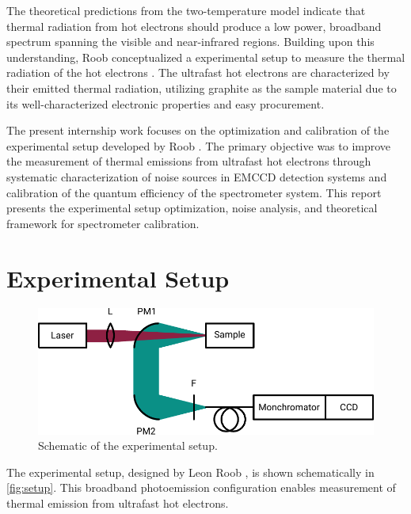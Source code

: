 \documentclass[
	parskip=half,
	a4paper,
]{scrarticle}
\begin{document}
The theoretical predictions from the two-temperature model indicate that thermal radiation from hot electrons should produce a low power, broadband spectrum spanning the visible and near-infrared regions. Building upon this understanding, Roob conceptualized a experimental setup to measure the thermal radiation of the hot electrons \cite{roob_thermal_2025}. The ultrafast hot electrons are characterized by their emitted thermal radiation, utilizing graphite as the sample material due to its well-characterized electronic properties \cite{nihira_temperature_2003} and easy procurement.

The present internship work focuses on the optimization and calibration of the experimental setup developed by Roob \cite{roob_thermal_2025}. The primary objective was to improve the measurement of thermal emissions from ultrafast hot electrons through systematic characterization of noise sources in EMCCD detection systems \cite{andor_establishing_nodate, dr_jo_walters_sensitivity_2023} and calibration of the quantum efficiency of the spectrometer system. 
This report presents the experimental setup optimization, noise analysis, and theoretical framework for spectrometer calibration.

\clearpage
\section{Experimental Setup}

\begin{figure}[hb]
    \centering
    \includegraphics{figures/setup.pdf}
    \caption{Schematic of the experimental setup.}
    \label{fig:setup}
\end{figure}

The experimental setup, designed by Leon Roob \cite{roob_thermal_2025}, is shown schematically in \autoref{fig:setup}. This broadband photoemission configuration enables measurement of thermal emission from ultrafast hot electrons.
\end{document}
